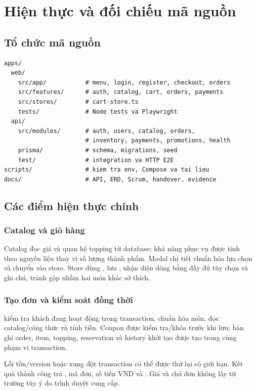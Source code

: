 \chapter{Hiện thực và đối chiếu mã nguồn}
\label{chap:hien-thuc}

\section{Tổ chức mã nguồn}
\begin{lstlisting}[caption={Các thư mục phục vụ luồng nghiệp vụ đang có}]
apps/
  web/
    src/app/           # menu, login, register, checkout, orders
    src/features/      # auth, catalog, cart, orders, payments
    src/stores/        # cart-store.ts
    tests/             # Node tests va Playwright
  api/
    src/modules/       # auth, users, catalog, orders,
                       # inventory, payments, promotions, health
    prisma/            # schema, migrations, seed
    test/              # integration va HTTP E2E
scripts/               # kiem tra env, Compose va tai lieu
docs/                  # API, ERD, Scrum, handover, evidence
\end{lstlisting}

\section{Các điểm hiện thực chính}
\subsection{Catalog và giỏ hàng}
Catalog đọc giá và quan hệ topping từ database; khả năng phục vụ được
tính theo nguyên liệu thay vì số lượng thành phẩm. Modal chi tiết chuẩn
hóa lựa chọn và chuyển vào store. Store dùng
, lưu , nhận diện dòng
bằng đầy đủ tùy chọn và ghi chú, tránh gộp nhầm hai món khác sở thích.

\subsection{Tạo đơn và kiểm soát đồng thời}
 kiểm tra khách đang hoạt động trong
transaction, chuẩn hóa món, đọc catalog/công thức và tính tiền. Coupon
được kiểm tra/khóa trước khi lưu; bản ghi order, item, topping,
reservation và history khởi tạo được tạo trong cùng phạm vi transaction.

Lỗi tồn/version hoặc xung đột transaction có thể được thử lại có giới
hạn. Kết quả thành công trả , mã đơn, số tiền VND và
. Giá và chủ đơn không lấy từ trường tùy ý
do trình duyệt cung cấp.

